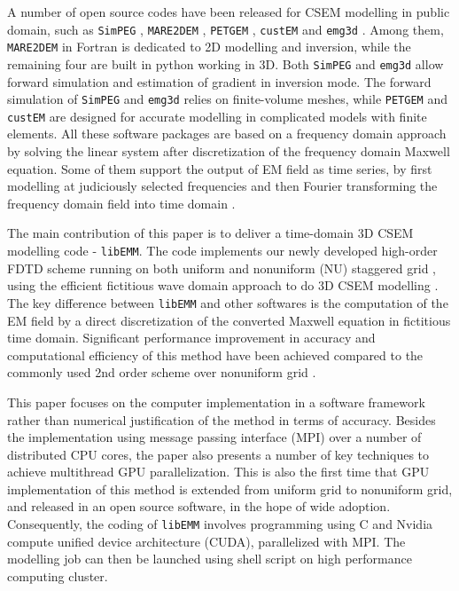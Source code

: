 \documentclass[a4paper,10pt]{article}
\begin{document}
A number of open source codes have been released for CSEM modelling in public domain, such as \verb|SimPEG| \citep{cockett2015simpeg}, \verb|MARE2DEM| \citep{key2016mare2dem},  \verb|PETGEM| \citep{castillo2018petgem}, \verb|custEM| \citep{rochlitz2019custem} and \verb|emg3d| \citep{werthmuller2019emg3d}. Among them, \verb|MARE2DEM| in Fortran is dedicated to 2D modelling and inversion, while the remaining four  are built in python working in 3D.  Both \verb|SimPEG| and \verb|emg3d| allow forward simulation and estimation of gradient in inversion mode.
The forward simulation of \verb|SimPEG| \citep{cockett2015simpeg} and \verb|emg3d| \citep{werthmuller2019emg3d} relies on finite-volume meshes, while \verb|PETGEM| \citep{castillo2018petgem} and \verb|custEM| \citep{rochlitz2019custem} are designed for accurate modelling in complicated models with finite elements.
All these software packages are based on a frequency domain approach by solving the linear system after discretization of the frequency domain Maxwell equation. Some of them support the output of EM field as time series, by first modelling at judiciously selected frequencies and then Fourier transforming the frequency domain field into time domain \citep{rochlitz2021evaluation}.

The main contribution of this paper is to deliver a time-domain 3D CSEM modelling code - \verb|libEMM|. The code implements our newly developed high-order FDTD scheme running on both uniform and nonuniform (NU) staggered grid \citep{Yang_2023_HFDNU}, using the efficient fictitious wave domain approach to do 3D CSEM modelling \citep{Mittet_2010_HFD}. The key difference between \verb|libEMM| and other softwares is the computation of the EM field by a direct discretization of the converted Maxwell equation in fictitious time domain. Significant performance improvement in  accuracy and computational efficiency of this method have been achieved compared to  the commonly used 2nd order scheme over nonuniform grid \citep{Yang_2023_HFDNU}.

This paper focuses on the computer implementation in a software framework rather than numerical justification of the method in terms of accuracy. Besides the implementation using message passing interface (MPI) over a number of distributed CPU cores, the paper also presents a number of key techniques to achieve multithread GPU parallelization. This is also the first time that GPU implementation of this method is extended from uniform grid \citep{Yang_2021_GPU_CSEM} to nonuniform grid, and released in an open source software, in the hope of wide adoption. Consequently, the coding of \verb|libEMM| involves programming using C and Nvidia compute unified device architecture (CUDA), parallelized with MPI. The modelling job can then be launched using shell script on high performance computing cluster.
\end{document}
